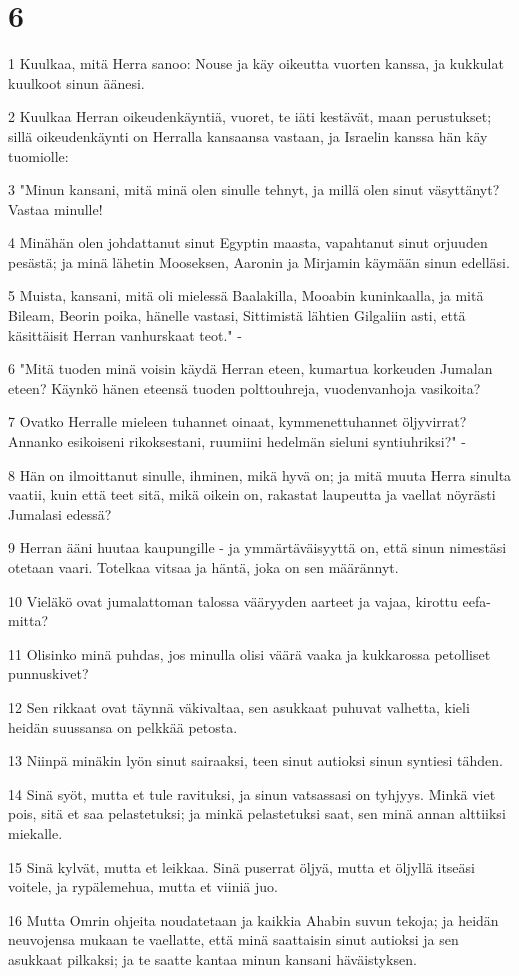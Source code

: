 \chapter{6}

\par 1 Kuulkaa, mitä Herra sanoo: Nouse ja käy oikeutta vuorten kanssa, ja kukkulat kuulkoot sinun äänesi.
\par 2 Kuulkaa Herran oikeudenkäyntiä, vuoret, te iäti kestävät, maan perustukset; sillä oikeudenkäynti on Herralla kansaansa vastaan, ja Israelin kanssa hän käy tuomiolle:
\par 3 "Minun kansani, mitä minä olen sinulle tehnyt, ja millä olen sinut väsyttänyt? Vastaa minulle!
\par 4 Minähän olen johdattanut sinut Egyptin maasta, vapahtanut sinut orjuuden pesästä; ja minä lähetin Mooseksen, Aaronin ja Mirjamin käymään sinun edelläsi.
\par 5 Muista, kansani, mitä oli mielessä Baalakilla, Mooabin kuninkaalla, ja mitä Bileam, Beorin poika, hänelle vastasi, Sittimistä lähtien Gilgaliin asti, että käsittäisit Herran vanhurskaat teot." -
\par 6 "Mitä tuoden minä voisin käydä Herran eteen, kumartua korkeuden Jumalan eteen? Käynkö hänen eteensä tuoden polttouhreja, vuodenvanhoja vasikoita?
\par 7 Ovatko Herralle mieleen tuhannet oinaat, kymmenettuhannet öljyvirrat? Annanko esikoiseni rikoksestani, ruumiini hedelmän sieluni syntiuhriksi?" -
\par 8 Hän on ilmoittanut sinulle, ihminen, mikä hyvä on; ja mitä muuta Herra sinulta vaatii, kuin että teet sitä, mikä oikein on, rakastat laupeutta ja vaellat nöyrästi Jumalasi edessä?
\par 9 Herran ääni huutaa kaupungille - ja ymmärtäväisyyttä on, että sinun nimestäsi otetaan vaari. Totelkaa vitsaa ja häntä, joka on sen määrännyt.
\par 10 Vieläkö ovat jumalattoman talossa vääryyden aarteet ja vajaa, kirottu eefa-mitta?
\par 11 Olisinko minä puhdas, jos minulla olisi väärä vaaka ja kukkarossa petolliset punnuskivet?
\par 12 Sen rikkaat ovat täynnä väkivaltaa, sen asukkaat puhuvat valhetta, kieli heidän suussansa on pelkkää petosta.
\par 13 Niinpä minäkin lyön sinut sairaaksi, teen sinut autioksi sinun syntiesi tähden.
\par 14 Sinä syöt, mutta et tule ravituksi, ja sinun vatsassasi on tyhjyys. Minkä viet pois, sitä et saa pelastetuksi; ja minkä pelastetuksi saat, sen minä annan alttiiksi miekalle.
\par 15 Sinä kylvät, mutta et leikkaa. Sinä puserrat öljyä, mutta et öljyllä itseäsi voitele, ja rypälemehua, mutta et viiniä juo.
\par 16 Mutta Omrin ohjeita noudatetaan ja kaikkia Ahabin suvun tekoja; ja heidän neuvojensa mukaan te vaellatte, että minä saattaisin sinut autioksi ja sen asukkaat pilkaksi; ja te saatte kantaa minun kansani häväistyksen.

